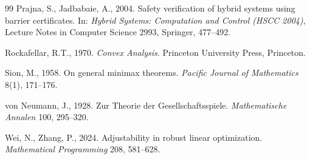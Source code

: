 \documentclass[11pt,a4paper]{article}
\theoremstyle{plain}
\theoremstyle{definition}
\theoremstyle{remark}
\begin{document}
\begin{thebibliography}{99}
 Prajna, S., Jadbabaie, A., 2004. Safety verification of hybrid systems using barrier certificates. In: \emph{Hybrid Systems: Computation and Control (HSCC 2004)}, Lecture Notes in Computer Science 2993, Springer, 477--492.

 Rockafellar, R.T., 1970. \emph{Convex Analysis}. Princeton University Press, Princeton.

 Sion, M., 1958. On general minimax theorems. \emph{Pacific Journal of Mathematics} 8(1), 171--176.

 von Neumann, J., 1928. Zur Theorie der Gesellschaftsspiele. \emph{Mathematische Annalen} 100, 295--320.

 Wei, N., Zhang, P., 2024. Adjustability in robust linear optimization. \emph{Mathematical Programming} 208, 581--628.

\end{thebibliography}
\end{document}
